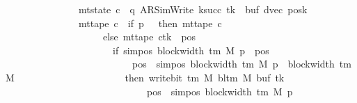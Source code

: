 \begin{isabellebody}
\ \ \ \ \ \ \ \ \ \ \ \ \ \ {\isasymand}\ mt{\isacharunderscore}{\kern0pt}state\ c{\isacharprime}{\kern0pt}{\isacharprime}{\kern0pt}\ {\isacharequal}{\kern0pt}\ {\isacharparenleft}{\kern0pt}q{\isacharcomma}{\kern0pt}\ AR{\isacharunderscore}{\kern0pt}SimWrite{\isacharcomma}{\kern0pt}\ k{\isacharunderscore}{\kern0pt}succ\ tk{\isacharcomma}{\kern0pt}\ {}{\isacharcomma}{\kern0pt}\ buf{\isacharcomma}{\kern0pt}\ dvec{\isacharcomma}{\kern0pt}\ posk{\isacharparenright}{\kern0pt}\isanewline
\ \ \ \ \ \ \ \ \ \ \ \ \ \ {\isasymand}\ mt{\isacharunderscore}{\kern0pt}tape\ c{\isacharprime}{\kern0pt}{\isacharprime}{\kern0pt}\ {\isacharequal}{\kern0pt}\ {\isacharparenleft}{\kern0pt}if\ p\ {\isacharequal}{\kern0pt}\ {}\ then\ mt{\isacharunderscore}{\kern0pt}tape\ c{\isacharprime}{\kern0pt}\isanewline
\ \ \ \ \ \ \ \ \ \ \ \ \ \ \ \ \ \ \ \ else\ {\isacharparenleft}{\kern0pt}mt{\isacharunderscore}{\kern0pt}tape\ c{\isacharprime}{\kern0pt}{\isacharparenright}{\kern0pt}{\isacharparenleft}{\kern0pt}tk\ {\isacharcolon}{\kern0pt}{\isacharequal}{\kern0pt}\ {\isacharparenleft}{\kern0pt}{\isasymlambda}pos{\isachardot}{\kern0pt}\isanewline
\ \ \ \ \ \ \ \ \ \ \ \ \ \ \ \ \ \ \ \ \ \ if\ sim{\isacharunderscore}{\kern0pt}pos\ {\isacharparenleft}{\kern0pt}block{\isacharunderscore}{\kern0pt}width\ {\isacharparenleft}{\kern0pt}{\isasymGamma}{\isacharunderscore}{\kern0pt}tm\ M{\isacharparenright}{\kern0pt}{\isacharparenright}{\kern0pt}\ p\ {\isasymle}\ pos\isanewline
\ \ \ \ \ \ \ \ \ \ \ \ \ \ \ \ \ \ \ \ \ \ \ \ \ {\isasymand}\ pos\ {\isacharless}{\kern0pt}\ sim{\isacharunderscore}{\kern0pt}pos\ {\isacharparenleft}{\kern0pt}block{\isacharunderscore}{\kern0pt}width\ {\isacharparenleft}{\kern0pt}{\isasymGamma}{\isacharunderscore}{\kern0pt}tm\ M{\isacharparenright}{\kern0pt}{\isacharparenright}{\kern0pt}\ p\ {\isacharplus}{\kern0pt}\ block{\isacharunderscore}{\kern0pt}width\ {\isacharparenleft}{\kern0pt}{\isasymGamma}{\isacharunderscore}{\kern0pt}tm\ M{\isacharparenright}{\kern0pt}\isanewline
\ \ \ \ \ \ \ \ \ \ \ \ \ \ \ \ \ \ \ \ \ \ then\ write{\isacharunderscore}{\kern0pt}bit\ {\isacharparenleft}{\kern0pt}{\isasymGamma}{\isacharunderscore}{\kern0pt}tm\ M{\isacharparenright}{\kern0pt}\ {\isacharparenleft}{\kern0pt}bl{\isacharunderscore}{\kern0pt}tm\ M{\isacharparenright}{\kern0pt}\ {\isacharparenleft}{\kern0pt}buf\ tk{\isacharparenright}{\kern0pt}\isanewline
\ \ \ \ \ \ \ \ \ \ \ \ \ \ \ \ \ \ \ \ \ \ \ \ \ \ \ \ \ {\isacharparenleft}{\kern0pt}pos\ {\isacharminus}{\kern0pt}\ sim{\isacharunderscore}{\kern0pt}pos\ {\isacharparenleft}{\kern0pt}block{\isacharunderscore}{\kern0pt}width\ {\isacharparenleft}{\kern0pt}{\isasymGamma}{\isacharunderscore}{\kern0pt}tm\ M{\isacharparenright}{\kern0pt}{\isacharparenright}{\kern0pt}\ p{\isacharparenright}{\kern0pt}\isanewline

\end{isabellebody}
